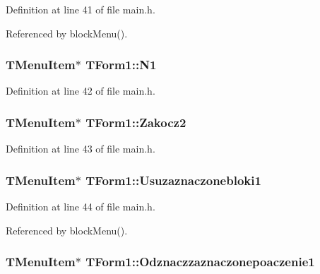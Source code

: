 Definition at line 41 of file main.h.

Referenced by blockMenu().\hypertarget{classTForm1_48a11274b861b0740194377fb412fc3c}{
\subsubsection[N1]{\setlength{\rightskip}{0pt plus 5cm}TMenuItem$\ast$ {\bf TForm1::N1}}}
\label{classTForm1_48a11274b861b0740194377fb412fc3c}




Definition at line 42 of file main.h.\hypertarget{classTForm1_b20e20b8aa20deb0db8782088a385b2f}{
\subsubsection[Zakocz2]{\setlength{\rightskip}{0pt plus 5cm}TMenuItem$\ast$ {\bf TForm1::Zakocz2}}}
\label{classTForm1_b20e20b8aa20deb0db8782088a385b2f}




Definition at line 43 of file main.h.\hypertarget{classTForm1_655f428c436b429b7ca71c131bae8e35}{
\subsubsection[Usuzaznaczonebloki1]{\setlength{\rightskip}{0pt plus 5cm}TMenuItem$\ast$ {\bf TForm1::Usuzaznaczonebloki1}}}
\label{classTForm1_655f428c436b429b7ca71c131bae8e35}




Definition at line 44 of file main.h.

Referenced by blockMenu().\hypertarget{classTForm1_fb3981dd76bf7b054bed4b9ff9faab3f}{
\subsubsection[Odznaczzaznaczonepoaczenie1]{\setlength{\rightskip}{0pt plus 5cm}TMenuItem$\ast$ {\bf TForm1::Odznaczzaznaczonepoaczenie1}}}
\label{classTForm1_fb3981dd76bf7b054bed4b9ff9faab3f}




